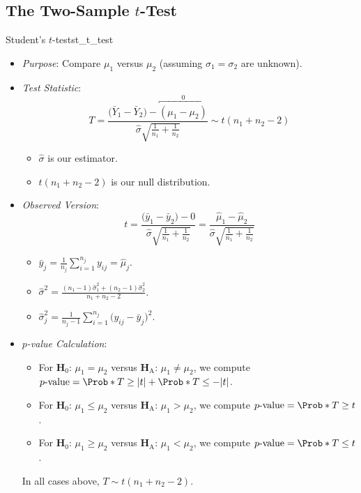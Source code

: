 \subsection{The Two-Sample \texorpdfstring{$ t $}{t}-Test}
\begin{Statistical_Test}{Student's $ t $-test}{st_t_test}
    \begin{itemize}
        \item \emph{Purpose}: Compare $ \mu_1 $ versus $ \mu_2 $ (assuming $ \sigma_1=\sigma_2 $ are unknown).
        \item \emph{Test Statistic}:
              \[ T=\frac{\bigl(\bar{Y}_1-\bar{Y}_2\bigr)-\overbracket{(\mu_1-\mu_2)}^0}{\displaystyle \hat{\sigma}\sqrt{\frac{1}{n_1}+\frac{1}{n_2}}}\sim t(n_1+n_2-2) \]
              \begin{itemize}
                  \item $ \hat{\sigma} $ is our estimator.
                  \item $ t(n_1+n_2-2) $ is our null distribution.
              \end{itemize}
        \item \emph{Observed Version}:
              \[ t=\frac{\bigl(\bar{y}_1-\bar{y}_2\bigr)-0}{\displaystyle \hat{\sigma}\sqrt{\frac{1}{n_1}+\frac{1}{n_2}}}
                  =\frac{\hat{\mu}_1-\hat{\mu}_2}{\displaystyle \hat{\sigma}\sqrt{\frac{1}{n_1}+\frac{1}{n_2}}} \]
              \begin{itemize}
                  \item $ \displaystyle \bar{y}_j= \frac{1}{n_j}\sum_{i=1}^{n_j} y_{ij}=\hat{\mu}_j $.
                  \item $ \displaystyle \hat{\sigma}^2=\frac{(n_1-1)\hat{\sigma}_1^2+(n_2-1)\hat{\sigma}_2^2}{n_1+n_2-2} $.
                  \item $ \displaystyle \hat{\sigma}_j^2=\frac{1}{n_j-1} \sum_{i=1}^{n_j} \bigl(y_{ij}-\bar{y}_j\bigr)^2 $.
              \end{itemize}
        \item \emph{$ p $-value Calculation}:
              \begin{itemize}
                  \item For $ \mathbf{H}_0 $: $ \mu_1=\mu_2 $ versus $ \mathbf{H}_\text{A} $: $ \mu_1\ne\mu_2 $, we compute
                        $ p\text{-value}=\Prob*{T\ge \abs{t}}+\Prob*{T\le -\abs{t}} $.
                  \item For $ \mathbf{H}_0 $: $ \mu_1\le\mu_2 $ versus $ \mathbf{H}_\text{A} $: $ \mu_1>\mu_2 $, we compute
                        $ p\text{-value}=\Prob*{T\ge t} $.
                  \item For $ \mathbf{H}_0 $: $ \mu_1\ge\mu_2 $ versus $ \mathbf{H}_\text{A} $: $ \mu_1<\mu_2 $, we compute
                        $ p\text{-value}=\Prob*{T\le t} $.
              \end{itemize}
              \begin{Remark}{}{}
                  In all cases above, $ T \sim t(n_1+n_2-2) $.
              \end{Remark}
    \end{itemize}
\end{Statistical_Test}
